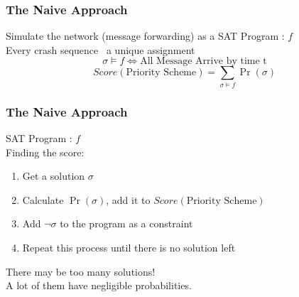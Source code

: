 \documentclass{beamer}
\begin{document}

\begin{frame}
\frametitle{The Naive Approach}
	Simulate the network (message forwarding) as a SAT Program : $ f $ \\[3ex]
	Every crash sequence \mapsto\ a unique assignment \sigma\  
	\vspace*{-5pt}
	$$ \sigma \vDash f \iff \text{All Message Arrive by time t} $$
	\vspace*{5pt}
	$$ Score(\text{Priority Scheme}) = \sum_{\sigma \vDash f}\Pr(\sigma) $$

\end{frame}

\begin{frame}
\frametitle{The Naive Approach}
	
	SAT Program : $ f $ \\[3ex]
	Finding the score:

	\begin{enumerate}
		\item Get a solution $\sigma$
		\item Calculate $\Pr(\sigma)$, add it to $Score(\text{Priority Scheme})$
		\item Add $\neg \sigma$ to the program as a constraint
		\item Repeat this process until there is no solution left\\[3ex]
	\end{enumerate}
	\color{red}
	There may be too many solutions!\\
	A lot of them have negligible probabilities.\\
\end{frame}
\end{document}
